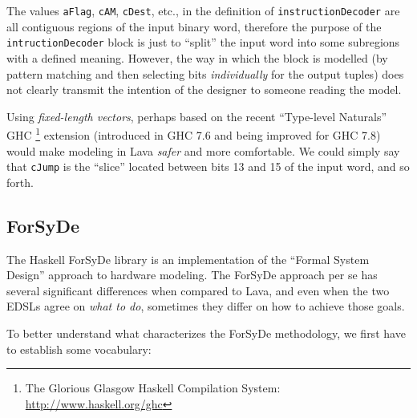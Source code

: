             The values \texttt{aFlag}, \texttt{cAM}, \texttt{cDest}, etc., in the definition of
            \texttt{instructionDecoder} are all contiguous regions of the input binary word,
            therefore the purpose of the \texttt{intructionDecoder} block is just to ``split'' the
            input word into some subregions with a defined meaning. However, the way in which the
            block is modelled (by pattern matching and then selecting bits \emph{individually} for
            the output tuples) does not clearly transmit the intention of the designer to someone
            reading the model.

            Using \emph{fixed-length vectors}, perhaps based on the recent ``Type-level Naturals''
            GHC \footnote{The Glorious Glasgow Haskell Compilation System:
                \url{http://www.haskell.org/ghc}} extension \cite{website:ghc-typenats} (introduced
            in GHC 7.6 and being improved for GHC 7.8) would make modeling in Lava \emph{safer} and
            more comfortable. We could simply say that \texttt{cJump} is the ``slice'' located
            between bits 13 and 15 of the input word, and so forth.


    \subsection{ForSyDe}
    \label{subsec:forsyde}
        The Haskell ForSyDe library is an implementation of the ``Formal System Design'' approach to
        hardware modeling\cite{forsyde1999}. The ForSyDe approach per se has several significant
        differences when compared to Lava, and even when the two \acp{EDSL} agree on \emph{what to do},
        sometimes they differ on how to achieve those goals.

        To better understand what characterizes the ForSyDe methodology, we first have to establish
        some vocabulary:

